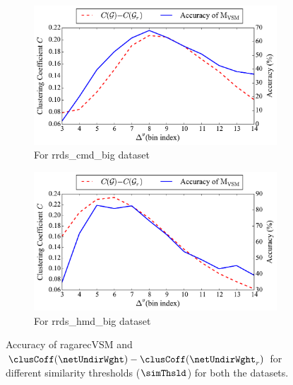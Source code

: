 \begin{figure}

	\begin{subfigure}{\textwidth}
			\centering
	\includegraphics[width=\figSizeEighty]{ch07_ragaRecognition/figures/CarnaticConfig3_Accuracy_vs_CCdiff.pdf}
		\caption{For \acrshort{rrds_cmd_big} dataset}
		\label{fig:performance_across_thresholds_cmd}
	\end{subfigure}
	\begin{subfigure}{\textwidth}
			\centering
		\includegraphics[width=\figSizeEighty]{ch07_ragaRecognition/figures/HindustaniConfig2_Accuracy_vs_CCdiff.pdf}
		\caption{For \acrshort{rrds_hmd_big} dataset}
		\label{fig:performance_across_thresholds_hmd}
	\end{subfigure}
		\caption[Accuracy of \acrshort{ragarecVSM} and $\clusCoff(\netUndirWght)-\clusCoff(\netUndirWght_r)$ for different values of $\simThsld$]{Accuracy of \acrshort{ragarecVSM} and $\clusCoff(\netUndirWght)-\clusCoff(\netUndirWght_r)$ for different similarity thresholds ($\simThsld$) for both the datasets.}
		\label{fig:performance_across_thresholds}
\end{figure}


